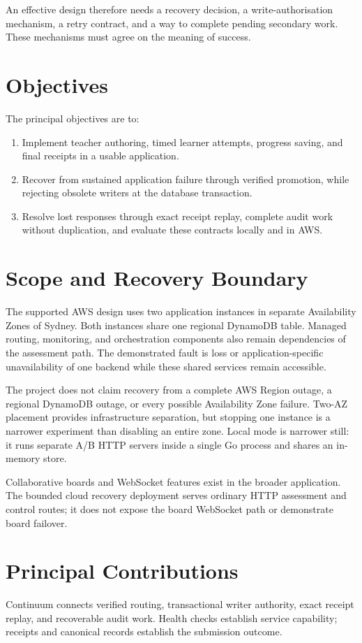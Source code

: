 An effective design therefore needs a recovery decision, a write-authorisation mechanism, a retry contract, and a way to complete pending secondary work. These mechanisms must agree on the meaning of success.
\section{Objectives}
The principal objectives are to:
\begin{enumerate}
\item Implement teacher authoring, timed learner attempts, progress saving, and final receipts in a usable application.
\item Recover from sustained application failure through verified promotion, while rejecting obsolete writers at the database transaction.
\item Resolve lost responses through exact receipt replay, complete audit work without duplication, and evaluate these contracts locally and in AWS.
\end{enumerate}
\section{Scope and Recovery Boundary}
The supported AWS design uses two application instances in separate Availability Zones of Sydney. Both instances share one regional DynamoDB table. Managed routing, monitoring, and orchestration components also remain dependencies of the assessment path. The demonstrated fault is loss or application-specific unavailability of one backend while these shared services remain accessible.

The project does not claim recovery from a complete AWS Region outage, a regional DynamoDB outage, or every possible Availability Zone failure. Two-AZ placement provides infrastructure separation, but stopping one instance is a narrower experiment than disabling an entire zone. Local mode is narrower still: it runs separate A/B HTTP servers inside a single Go process and shares an in-memory store.

Collaborative boards and WebSocket features exist in the broader application. The bounded cloud recovery deployment serves ordinary HTTP assessment and control routes; it does not expose the board WebSocket path or demonstrate board failover.
\section{Principal Contributions}
Continuum connects verified routing, transactional writer authority, exact receipt replay, and recoverable audit work. Health checks establish service capability; receipts and canonical records establish the submission outcome.

